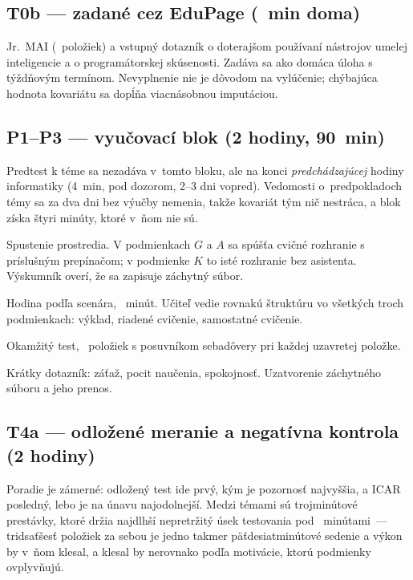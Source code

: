 \subsection*{T0b --- zadané cez EduPage (\mplBudgetTob~min doma)}

Jr.~MAI (\instrMaiItems~položiek) a vstupný dotazník o doterajšom používaní nástrojov umelej inteligencie a o programátorskej skúsenosti. Zadáva sa ako domáca úloha s týždňovým termínom. Nevyplnenie nie je dôvodom na vylúčenie; chýbajúca hodnota kovariátu sa dopĺňa viacnásobnou imputáciou.

\subsection*{P1--P3 --- vyučovací blok (2 hodiny, 90~min)}

Predtest k téme sa nezadáva v~tomto bloku, ale na konci \emph{predchádzajúcej} hodiny informatiky (4~min, pod dozorom, 2--3 dni vopred). Vedomosti o~predpokladoch témy sa za dva dni bez výučby nemenia, takže kovariát tým nič nestráca, a blok získa štyri minúty, ktoré v~ňom nie sú.

\begin{description}[leftmargin=1.5cm, style=nextline, nosep]
    \item[0--4 min] Spustenie prostredia. V podmienkach $G$ a $A$ sa spúšťa cvičné rozhranie s príslušným prepínačom; v podmienke $K$ to isté rozhranie bez asistenta. Výskumník overí, že sa zapisuje záchytný súbor.
    \item[4--68 min] Hodina podľa scenára, \instrLessonMin{}~minút. Učiteľ vedie rovnakú štruktúru vo všetkých troch podmienkach: výklad, riadené cvičenie, samostatné cvičenie.
    \item[68--84 min] Okamžitý test, \asmFormItems{}~položiek s posuvníkom sebadôvery pri každej uzavretej položke.
    \item[84--89 min] Krátky dotazník: záťaž, pocit naučenia, spokojnosť. Uzatvorenie záchytného súboru a jeho prenos.
\end{description}

\subsection*{T4a --- odložené meranie a negatívna kontrola (2 hodiny)}

Poradie je zámerné: odložený test ide prvý, kým je pozornosť najvyššia, a ICAR posledný, lebo je na únavu najodolnejší. Medzi témami sú trojminútové prestávky, ktoré držia najdlhší nepretržitý úsek testovania pod \instrFatigueCap{}~minútami~--- tridsaťšesť položiek za sebou je jedno takmer päťdesiatminútové sedenie a výkon by v~ňom klesal, a klesal by nerovnako podľa motivácie, ktorú podmienky ovplyvňujú.

